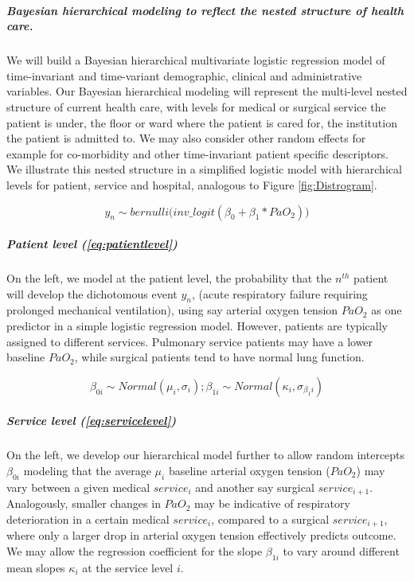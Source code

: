 \documentclass[11pt,notitlepage]{article}
\begin{document}
\subparagraph*{Bayesian hierarchical modeling to reflect the nested structure of health care.}   
We will build a Bayesian hierarchical multivariate logistic regression model of time-invariant and time-variant demographic, clinical and administrative variables. Our Bayesian hierarchical modeling will represent the multi-level nested structure of current health care, with levels for medical or surgical service the patient is under, the floor or ward where the patient is cared for, the institution the patient is admitted to. We may also consider other random effects for example for co-morbidity and other time-invariant patient specific descriptors. We illustrate this nested structure in a simplified logistic model with hierarchical levels for patient, service and hospital, analogous to Figure \ref{fig:Distrogram}. 

\begin{figure}
\vspace{-10pt}
 \begin{equation} \label{eq:patientlevel}
 y_{n} \sim bernulli \Big(inv\_logit (\beta_{0} +\beta_{1} * PaO_2) \Big)
 \end{equation}
\vspace{-25pt}
\end{figure}

\subparagraph*{Patient level (\ref{eq:patientlevel})}
On the left, we model at the patient level, the probability that the $n^{th}$ patient will develop the dichotomous event $y_n$, (acute respiratory failure requiring prolonged mechanical ventilation), using say arterial oxygen tension $PaO_{2}$ as one predictor in a simple logistic regression model. However, patients are typically assigned to different services. Pulmonary service patients may have a lower baseline $PaO_2$, while surgical patients tend to have normal lung function. 

\begin{figure}
\vspace{-10pt}
\begin{equation} \label{eq:servicelevel}
 \beta_{0i} \sim Normal (\mu_i , \sigma_{i}); \beta_{1i} \sim Normal (\kappa_i, \sigma_{\beta_1i})
\end{equation}
\vspace{-25pt}
\end{figure}

\subparagraph*{Service level (\ref{eq:servicelevel})}
On the left, we develop our hierarchical model further to allow random intercepts $\beta_{0i}$ modeling that the average  $\mu_i$ baseline arterial oxygen tension ($PaO_2$) may vary between a given medical $service_i$ and another say surgical $service_{i+1}$. Analogously, smaller changes in $PaO_2$ may be indicative of respiratory deterioration in a certain medical $service_i$, compared to a surgical $service_{i+1}$, where only a larger drop in arterial oxygen tension effectively predicts outcome. We may allow the regression coefficient for the slope $\beta_{1i}$ to vary around different mean slopes $\kappa_i$ at the service level $i$. 
\end{document}
